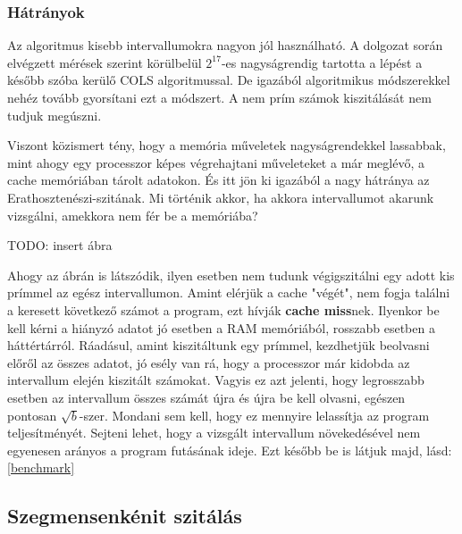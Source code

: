 \documentclass[twoside, a4paper, 12pt]{article}
\begin{document}
 \subsubsection{Hátrányok} \label{badbad}
Az algoritmus kisebb intervallumokra nagyon jól használható. A dolgozat során elvégzett mérések szerint körülbelül $2^17$-es nagyságrendig tartotta a lépést a később szóba kerülő COLS algoritmussal. De igazából algoritmikus módszerekkel nehéz tovább gyorsítani ezt a módszert. A nem prím számok kiszitálását nem tudjuk megúszni. \par
Viszont közismert tény, hogy a memória műveletek nagyságrendekkel lassabbak, mint ahogy egy processzor képes végrehajtani műveleteket a már meglévő, a cache memóriában tárolt adatokon. És itt jön ki igazából a nagy hátránya az Erathosztenészi-szitának. Mi történik akkor, ha akkora intervallumot akarunk vizsgálni, amekkora nem fér be a memóriába? \par
TODO: insert ábra \par
Ahogy az ábrán is látszódik, ilyen esetben nem tudunk végigszitálni egy adott kis prímmel az egész intervallumon. Amint elérjük a cache "végét", nem fogja találni a keresett következő számot a program, ezt hívják \textbf{cache miss}nek. Ilyenkor be kell kérni a hiányzó adatot jó esetben a RAM memóriából, rosszabb esetben a háttértárról. Ráadásul, amint kiszitáltunk egy prímmel, kezdhetjük beolvasni előről az összes adatot, jó esély van rá, hogy a processzor már kidobda az intervallum elején kiszitált számokat. Vagyis ez azt jelenti, hogy legrosszabb esetben az intervallum összes számát újra és újra be kell olvasni, egészen pontosan $\sqrt{b}$-szer. Mondani sem kell, hogy ez mennyire lelassítja az program teljesítményét. Sejteni lehet, hogy a vizsgált intervallum növekedésével nem egyenesen arányos a program futásának ideje. Ezt később be is látjuk majd, lásd: \ref{benchmark}

\subsection{Szegmensenkénit szitálás}
\end{document}
